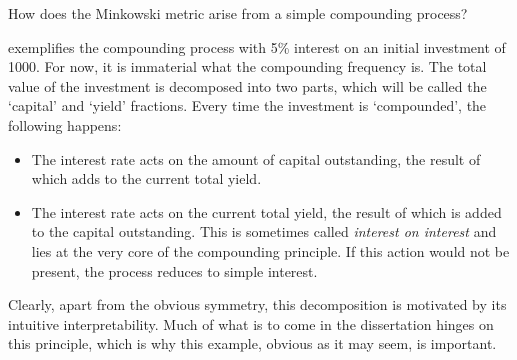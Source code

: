 \begin{question}
    How does the Minkowski metric arise from a simple compounding process?
\end{question}
 exemplifies the compounding process with 5\% interest on an initial investment of \si{\money}1000. For now, it is immaterial what the compounding frequency is. The total value of the investment is decomposed into two parts, which will be called the `capital' and `yield' fractions. Every time the investment is `compounded', the following happens:
\begin{itemize}
    \item The interest rate acts on the amount of capital outstanding, the result of which adds to the current total yield.
    \item The interest rate acts on the current total yield, the result of which is added to the capital outstanding. This is sometimes called \textit{interest on interest} and lies at the very core of the compounding principle. If this action would not be present, the process reduces to simple interest.
\end{itemize}
Clearly, apart from the obvious symmetry, this decomposition is motivated by its intuitive interpretability. Much of what is to come in the dissertation hinges on this principle, which is why this example, obvious as it may seem, is important. 
